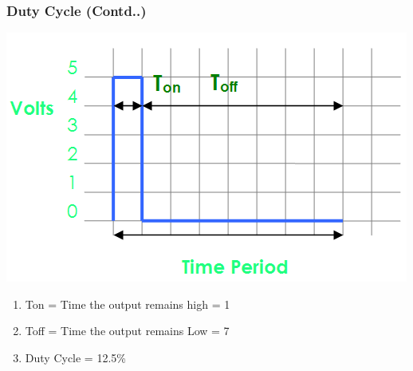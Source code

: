 \documentclass[table,10pt,red]{beamer}	%
\begin{document}
\begin{frame}[shrink = 2]

\frametitle{Duty Cycle (Contd..)} \pause

\includegraphics[width = \linewidth]{12_dutycycle} \pause

\begin{enumerate}[$\checkmark$]

\item<+-|alert@+> Ton = Time the output remains high = 1

\item<+-|alert@+> Toff = Time the output remains Low = 7

\item<+-|alert@+> Duty Cycle = 12.5\%

\end{enumerate}

\end{frame}


\end{document}

